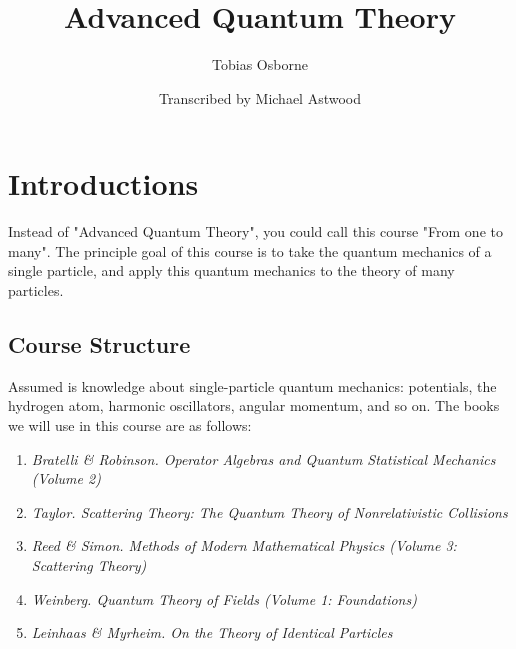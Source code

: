 \documentclass{article}
\title{Advanced Quantum Theory}
\author{Tobias Osborne}
\date{Transcribed by Michael Astwood}
\begin{document}


\pagebreak

\tableofcontents

\pagebreak

\section{Introductions}
Instead of "Advanced Quantum Theory", you could call this course "From one to many". The principle goal of this course is to take the quantum mechanics of a single particle, and apply this quantum mechanics to the theory of many particles.
\subsection{Course Structure}
Assumed is knowledge about single-particle quantum mechanics: potentials, the hydrogen atom, harmonic oscillators, angular momentum, and so on. The books we will use in this course are as follows:
\begin{enumerate}
    \item \textit{Bratelli \& Robinson. Operator Algebras and Quantum Statistical Mechanics (Volume 2)}
    \item \textit{Taylor. Scattering Theory: The Quantum Theory of Nonrelativistic Collisions}
    \item \textit{Reed \& Simon. Methods of Modern Mathematical Physics (Volume 3: Scattering Theory)}
    \item \textit{Weinberg. Quantum Theory of Fields (Volume 1: Foundations)}
    \item \textit{Leinhaas \& Myrheim. On the Theory of Identical Particles}
\end{enumerate}
\end{document}
